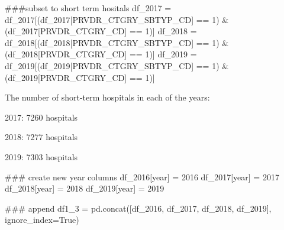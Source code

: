 \documentclass[
  letterpaper,
  DIV=11,
  numbers=noendperiod]{scrartcl}
\newenvironment{Shaded}{\begin{snugshade}}{\end{snugshade}}
\newcommand{\CommentTok}[1]{\textcolor[rgb]{0.37,0.37,0.37}{#1}}
\newcommand{\DecValTok}[1]{\textcolor[rgb]{0.68,0.00,0.00}{#1}}
\newcommand{\NormalTok}[1]{\textcolor[rgb]{0.00,0.23,0.31}{#1}}
\newcommand{\OperatorTok}[1]{\textcolor[rgb]{0.37,0.37,0.37}{#1}}
\newcommand{\StringTok}[1]{\textcolor[rgb]{0.13,0.47,0.30}{#1}}
\newcommand{\VariableTok}[1]{\textcolor[rgb]{0.07,0.07,0.07}{#1}}
\begin{document}
\begin{Shaded}
\begin{Highlighting}[]
\CommentTok{\#\#\#subset to short term hositals}
\NormalTok{df\_2017 }\OperatorTok{=}\NormalTok{ df\_2017[(df\_2017[}\StringTok{\textquotesingle{}PRVDR\_CTGRY\_SBTYP\_CD\textquotesingle{}}\NormalTok{] }\OperatorTok{==} \DecValTok{1}\NormalTok{) }\OperatorTok{\&}\NormalTok{ (df\_2017[}\StringTok{\textquotesingle{}PRVDR\_CTGRY\_CD\textquotesingle{}}\NormalTok{] }\OperatorTok{==} \DecValTok{1}\NormalTok{)]}
\NormalTok{df\_2018 }\OperatorTok{=}\NormalTok{ df\_2018[(df\_2018[}\StringTok{\textquotesingle{}PRVDR\_CTGRY\_SBTYP\_CD\textquotesingle{}}\NormalTok{] }\OperatorTok{==} \DecValTok{1}\NormalTok{) }\OperatorTok{\&}\NormalTok{ (df\_2018[}\StringTok{\textquotesingle{}PRVDR\_CTGRY\_CD\textquotesingle{}}\NormalTok{] }\OperatorTok{==} \DecValTok{1}\NormalTok{)]}
\NormalTok{df\_2019 }\OperatorTok{=}\NormalTok{ df\_2019[(df\_2019[}\StringTok{\textquotesingle{}PRVDR\_CTGRY\_SBTYP\_CD\textquotesingle{}}\NormalTok{] }\OperatorTok{==} \DecValTok{1}\NormalTok{) }\OperatorTok{\&}\NormalTok{ (df\_2019[}\StringTok{\textquotesingle{}PRVDR\_CTGRY\_CD\textquotesingle{}}\NormalTok{] }\OperatorTok{==} \DecValTok{1}\NormalTok{)]}
\end{Highlighting}
\end{Shaded}

The number of short-term hospitals in each of the years:

2017: 7260 hospitals

2018: 7277 hospitals

2019: 7303 hospitals

\begin{Shaded}
\begin{Highlighting}[]
\CommentTok{\#\#\# create new year columns}
\NormalTok{df\_2016[}\StringTok{\textquotesingle{}year\textquotesingle{}}\NormalTok{] }\OperatorTok{=} \DecValTok{2016}
\NormalTok{df\_2017[}\StringTok{\textquotesingle{}year\textquotesingle{}}\NormalTok{] }\OperatorTok{=} \DecValTok{2017}
\NormalTok{df\_2018[}\StringTok{\textquotesingle{}year\textquotesingle{}}\NormalTok{] }\OperatorTok{=} \DecValTok{2018}
\NormalTok{df\_2019[}\StringTok{\textquotesingle{}year\textquotesingle{}}\NormalTok{] }\OperatorTok{=} \DecValTok{2019}

\CommentTok{\#\#\# append}
\NormalTok{df1\_3 }\OperatorTok{=}\NormalTok{ pd.concat([df\_2016, df\_2017, df\_2018, df\_2019], ignore\_index}\OperatorTok{=}\VariableTok{True}\NormalTok{)}
\end{Highlighting}
\end{Shaded}
\end{document}
